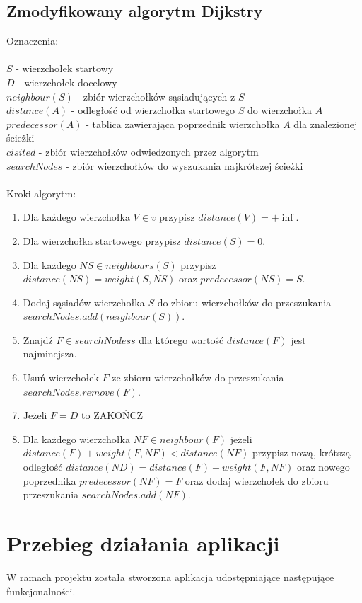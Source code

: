 \documentclass[10pt,a4paper]{article}
\begin{document}
\subsection{Zmodyfikowany algorytm Dijkstry}
\label{modif}
Oznaczenia: \\ \\
$S$ - wierzchołek startowy \\
$D$ - wierzchołek docelowy \\ 
$neighbour(S)$ - zbiór wierzchołków sąsiadujących z $S$ \\
$distance(A)$ - odległość od wierzchołka startowego $S$ do wierzchołka $A$ \\
$predecessor(A)$ - tablica zawierająca poprzednik wierzchołka $A$ dla znalezionej ścieżki \\
$cisited$ - zbiór wierzchołków odwiedzonych przez algorytm \\
$searchNodes$ - zbiór wierzchołków do wyszukania najkrótszej ścieżki \\ \\

Kroki algorytm: 
\begin{enumerate}
\item Dla każdego wierzchołka $V \in v $ przypisz $distance(V)=+\inf$.
\item Dla wierzchołka startowego przypisz $distance(S)=0$.
\item Dla każdego $NS \in neighbours(S)$ przypisz $distance(NS)=weight(S,NS)$ oraz $predecessor(NS)=S$.
\item Dodaj sąsiadów wierzchołka $S$ do zbioru wierzchołków do przeszukania $searchNodes.add(neighbour(S))$.
\item Znajdź $F \in searchNodess$ dla którego wartość $distance(F)$ jest najminejsza.
\item Usuń wierzchołek $F$ ze zbioru wierzchołków do przeszukania $searchNodes.remove(F)$.
\item Jeżeli $F=D$ to ZAKOŃCZ
\item Dla każdego wierzchołka $NF \in neighbour(F)$ jeżeli $distance(F) + weight(F,NF)<distance(NF)$ przypisz nową, krótszą odległość $distance(ND)=distance(F)+weight(F, NF)$ oraz nowego poprzednika $predecessor(NF)=F$ oraz dodaj wierzchołek do zbioru przeszukania $searchNodes.add(NF)$.
\end{enumerate}


\section{Przebieg działania aplikacji}
W ramach projektu została stworzona aplikacja udostępniające następujące funkcjonalności.
\end{document}
